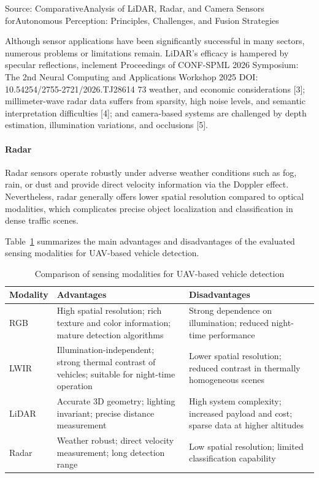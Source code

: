 \documentclass[12pt,oneside,bibtotoc,liststotoc]{scrbook}
\begin{document}
Source:
ComparativeAnalysis of LiDAR, Radar, and Camera Sensors
forAutonomous Perception: Principles, Challenges, and
Fusion Strategies

Although sensor applications have been significantly successful in many sectors, numerous
problems or limitations remain. LiDAR's efficacy is hampered by specular reflections, inclement
Proceedings of CONF-SPML 2026 Symposium: The 2nd Neural Computing and Applications Workshop 2025
DOI: 10.54254/2755-2721/2026.TJ28614
73
weather, and economic considerations [3]; millimeter-wave radar data suffers from sparsity, high
noise levels, and semantic interpretation difficulties [4]; and camera-based systems are challenged
by depth estimation, illumination variations, and occlusions [5].


\paragraph{Radar}

Radar sensors operate robustly under adverse weather conditions
such as fog, rain, or dust and provide direct velocity
information via the Doppler effect. Nevertheless, radar
generally offers lower spatial resolution compared to optical
modalities, which complicates precise object localization and
classification in dense traffic scenes.

Table~\ref{tab:modality_comparison} summarizes the main
advantages and disadvantages of the evaluated sensing
modalities for UAV-based vehicle detection.


\begin{table}[t]
\centering
\caption{Comparison of sensing modalities for UAV-based vehicle detection}
\label{tab:modality_comparison}

\begin{tabularx}{\textwidth}{l X X}
\hline
\textbf{Modality} & \textbf{Advantages} & \textbf{Disadvantages} \\
\hline
RGB & High spatial resolution; rich texture and color information; mature detection algorithms &
Strong dependence on illumination; reduced night-time performance \\

LWIR & Illumination-independent; strong thermal contrast of vehicles; suitable for night-time operation &
Lower spatial resolution; reduced contrast in thermally homogeneous scenes \\

LiDAR & Accurate 3D geometry; lighting invariant; precise distance measurement &
High system complexity; increased payload and cost; sparse data at higher altitudes \\

Radar & Weather robust; direct velocity measurement; long detection range &
Low spatial resolution; limited classification capability \\
\hline
\end{tabularx}
\end{table}
\end{document}
